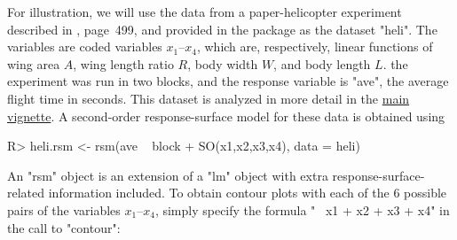 \documentclass[article,nojss]{jss}
\def\rsm{\pkg{rsm}}
\begin{document}
For illustration, we will use the data from a paper-helicopter experiment described in \cite{Box05}, page~499, and provided in the \rsm{} package as the dataset "heli".  The variables are coded variables $x_1$--$x_4$, which are, respectively, linear functions of wing area $A$, wing length ratio $R$, body width $W$, and body length $L$.  the experiment was run in two blocks, and the response variable is "ave", the average flight time in seconds.  This dataset is analyzed in more detail in  the \href{rsm.pdf}{main \rsm{} vignette}.  A second-order response-surface model for these data is obtained using
\begin{Schunk}
\begin{Sinput}
R> heli.rsm <- rsm(ave ~ block + SO(x1,x2,x3,x4), data = heli)
\end{Sinput}
\end{Schunk}
An "rsm" object is an extension of a "lm" object with extra response-surface-related information included.
To obtain contour plots with each of the 6 possible pairs of the variables $x_1$--$x_4$, simply specify the formula "~ x1 + x2 + x3 + x4" in the call to "contour":
\end{document}
